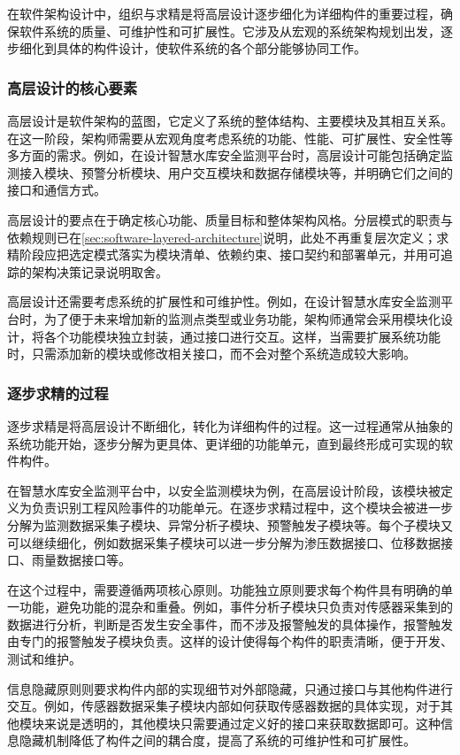 在软件架构设计中，组织与求精是将高层设计逐步细化为详细构件的重要过程，确保软件系统的质量、可维护性和可扩展性。它涉及从宏观的系统架构规划出发，逐步细化到具体的构件设计，使软件系统的各个部分能够协同工作。

\subsubsection{高层设计的核心要素}
高层设计是软件架构的蓝图，它定义了系统的整体结构、主要模块及其相互关系。在这一阶段，架构师需要从宏观角度考虑系统的功能、性能、可扩展性、安全性等多方面的需求。例如，在设计智慧水库安全监测平台时，高层设计可能包括确定监测接入模块、预警分析模块、用户交互模块和数据存储模块等，并明确它们之间的接口和通信方式。

高层设计的要点在于确定核心功能、质量目标和整体架构风格。分层模式的职责与依赖规则已在\ref{sec:software-layered-architecture}说明，此处不再重复层次定义；求精阶段应把选定模式落实为模块清单、依赖约束、接口契约和部署单元，并用可追踪的架构决策记录说明取舍。

高层设计还需要考虑系统的扩展性和可维护性。例如，在设计智慧水库安全监测平台时，为了便于未来增加新的监测点类型或业务功能，架构师通常会采用模块化设计，将各个功能模块独立封装，通过接口进行交互。这样，当需要扩展系统功能时，只需添加新的模块或修改相关接口，而不会对整个系统造成较大影响。

\subsubsection{逐步求精的过程}
逐步求精是将高层设计不断细化，转化为详细构件的过程。这一过程通常从抽象的系统功能开始，逐步分解为更具体、更详细的功能单元，直到最终形成可实现的软件构件。

在智慧水库安全监测平台中，以安全监测模块为例，在高层设计阶段，该模块被定义为负责识别工程风险事件的功能单元。在逐步求精过程中，这个模块会被进一步分解为监测数据采集子模块、异常分析子模块、预警触发子模块等。每个子模块又可以继续细化，例如数据采集子模块可以进一步分解为渗压数据接口、位移数据接口、雨量数据接口等。

在这个过程中，需要遵循两项核心原则。功能独立原则要求每个构件具有明确的单一功能，避免功能的混杂和重叠。例如，事件分析子模块只负责对传感器采集到的数据进行分析，判断是否发生安全事件，而不涉及报警触发的具体操作，报警触发由专门的报警触发子模块负责。这样的设计使得每个构件的职责清晰，便于开发、测试和维护。

信息隐藏原则则要求构件内部的实现细节对外部隐藏，只通过接口与其他构件进行交互。例如，传感器数据采集子模块内部如何获取传感器数据的具体实现，对于其他模块来说是透明的，其他模块只需要通过定义好的接口来获取数据即可。这种信息隐藏机制降低了构件之间的耦合度，提高了系统的可维护性和可扩展性。

